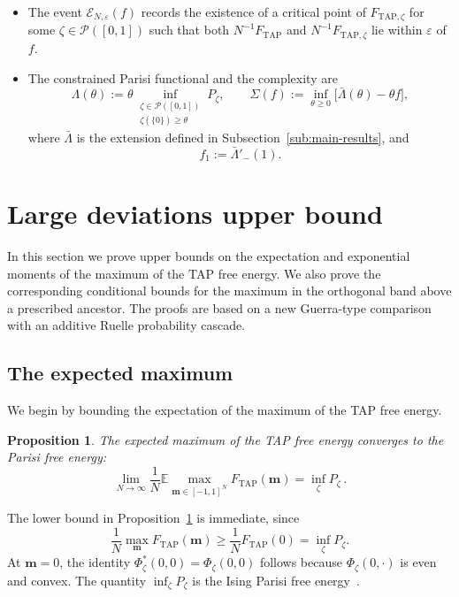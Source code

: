\documentclass[a4paper,10pt,reqno]{amsart}
\numberwithin{equation}{section}
\newtheorem{proposition}{Proposition}[section]
\newcommand{\ve}{\varepsilon}
\newcommand{\dE}{\mathbb{E}}%
\newcommand{\mc}{\mathcal}
\newcommand{\TAP}{\mathrm{TAP}}
\newcommand{\bfm}{\mathbf{m}}
\begin{document}
	\begin{itemize}\itemsep2pt
		\item The event \(\mc E_{N,\ve}(f)\) records the existence of a critical
		point of \(F_{\TAP,\zeta}\) for some
		\(\zeta\in\mc P([0,1])\) such that both
		\(N^{-1}F_{\TAP}\) and \(N^{-1}F_{\TAP,\zeta}\) lie within \(\ve\) of \(f\).
		
		\item The constrained Parisi functional and the complexity are
		\[
		\Lambda(\theta)
		:=
		\theta
		\inf_{\substack{\zeta\in\mc P([0,1])\\
				\zeta(\{0\})\ge\theta}}
		P_\zeta,
		\qquad
		\Sigma(f)
		:=
		\inf_{\theta\ge0}\bigl[\bar\Lambda(\theta)-\theta f\bigr],
		\]
		where \(\bar\Lambda\) is the extension defined in
		Subsection~\ref{sub:main-results}, and
		\[
		f_1:=\bar\Lambda'_-(1).
		\]
	\end{itemize}
	
	\section{Large deviations upper bound}\label{sec:new5}
	
	In this section we prove upper bounds on the expectation and exponential moments of the maximum of the TAP free energy. We also prove the corresponding conditional bounds for the maximum in the orthogonal band above a prescribed ancestor. The proofs are based on a new Guerra-type comparison with an additive Ruelle probability cascade.
	
	
	\subsection{The expected maximum}\label{sub:new5-ising}
	
	We begin by bounding the expectation of the maximum of the TAP free energy.
	
	\begin{proposition}\label{prop:ising-exp}
		The expected maximum of the TAP free energy converges to the Parisi free energy:
		\[
		\lim_{N\to\infty}\frac1N\dE\max_{\bfm\in[-1,1]^N}F_{\TAP}(\bfm)
		=\inf_\zeta P_\zeta\,.
		\]
	\end{proposition}
	
	The lower bound in Proposition~\ref{prop:ising-exp} is immediate, since
	\[
	\frac1N\max_\bfm F_{\TAP}(\bfm)
	\ge
	\frac1N F_{\TAP}(0)
	=
	\inf_\zeta P_\zeta.
	\]
	At $\bfm=0$, the identity
	$\Phi_\zeta^*(0,0)=\Phi_\zeta(0,0)$ follows because
	$\Phi_\zeta(0,\cdot)$ is even and convex. The quantity
	$\inf_\zeta P_\zeta$ is the Ising Parisi free energy~\cite{PanchenkoBook}.
	
\end{document}
